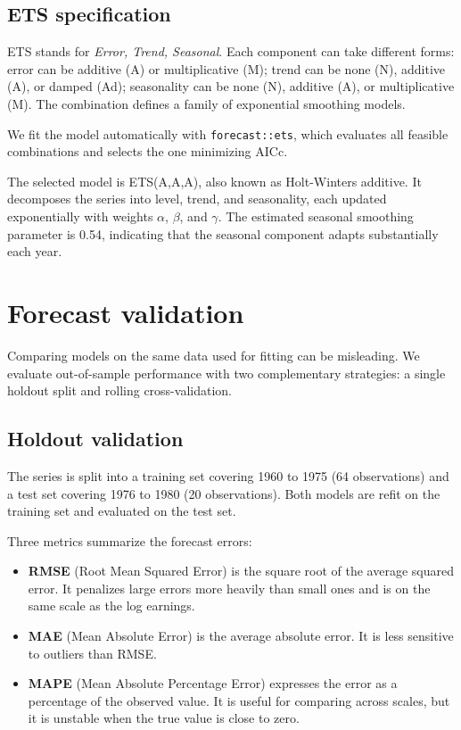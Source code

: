 \documentclass[
  english,
  a4paper,
]{article}
\newcounter{none} %
\providecommand{\tightlist}{%
  \setlength{\itemsep}{0pt}\setlength{\parskip}{0pt}}
\begin{document}
\subsection{ETS specification}\label{ets-specification}

ETS stands for \emph{Error, Trend, Seasonal}. Each component can take
different forms: error can be additive (A) or multiplicative (M); trend
can be none (N), additive (A), or damped (Ad); seasonality can be none
(N), additive (A), or multiplicative (M). The combination defines a
family of exponential smoothing models.

We fit the model automatically with \texttt{forecast::ets}, which
evaluates all feasible combinations and selects the one minimizing AICc.

The selected model is ETS(A,A,A), also known as Holt-Winters additive.
It decomposes the series into level, trend, and seasonality, each
updated exponentially with weights \(\alpha\), \(\beta\), and
\(\gamma\). The estimated seasonal smoothing parameter is 0.54,
indicating that the seasonal component adapts substantially each year.

\section{Forecast validation}\label{forecast-validation}

Comparing models on the same data used for fitting can be misleading. We
evaluate out-of-sample performance with two complementary strategies: a
single holdout split and rolling cross-validation.

\subsection{Holdout validation}\label{holdout-validation}

The series is split into a training set covering 1960 to 1975 (64
observations) and a test set covering 1976 to 1980 (20 observations).
Both models are refit on the training set and evaluated on the test set.

Three metrics summarize the forecast errors:

\begin{itemize}
\tightlist
\item
  \textbf{RMSE} (Root Mean Squared Error) is the square root of the
  average squared error. It penalizes large errors more heavily than
  small ones and is on the same scale as the log earnings.
\item
  \textbf{MAE} (Mean Absolute Error) is the average absolute error. It
  is less sensitive to outliers than RMSE.
\item
  \textbf{MAPE} (Mean Absolute Percentage Error) expresses the error as
  a percentage of the observed value. It is useful for comparing across
  scales, but it is unstable when the true value is close to zero.
\end{itemize}
\end{document}
